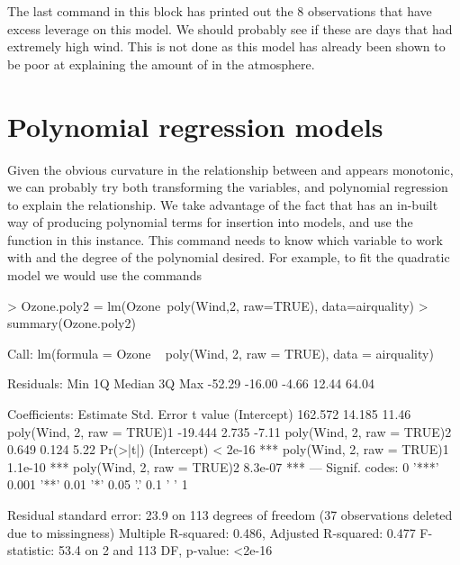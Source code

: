 The last command in this block has printed out the 8 observations that have excess leverage on this model. We should probably see if these are days that had extremely high wind. This is not done as this model has already been shown to be poor at explaining the amount of  in the atmosphere. 
 
 
\section{Polynomial regression models} 
\label{PolyReg} 
 
Given the obvious curvature in the relationship between  and  appears monotonic, we can probably try both transforming the variables, and polynomial regression to explain the relationship. We take advantage of the  
fact that \R{} has an in-built way of producing polynomial terms for insertion into models, and use the  function in this instance. This command needs to know which variable to work with and the degree of the polynomial desired. For example, to fit the quadratic model we would use the commands 

\begin{Schunk}
\begin{Sinput}
> Ozone.poly2 = lm(Ozone~poly(Wind,2, raw=TRUE), data=airquality) 
> summary(Ozone.poly2) 
\end{Sinput}
\begin{Soutput}

Call:
lm(formula = Ozone ~ poly(Wind, 2, raw = TRUE), data = airquality)

Residuals:
   Min     1Q Median     3Q    Max 
-52.29 -16.00  -4.66  12.44  64.04 

Coefficients:
                           Estimate Std. Error t value
(Intercept)                 162.572     14.185   11.46
poly(Wind, 2, raw = TRUE)1  -19.444      2.735   -7.11
poly(Wind, 2, raw = TRUE)2    0.649      0.124    5.22
                           Pr(>|t|)    
(Intercept)                 < 2e-16 ***
poly(Wind, 2, raw = TRUE)1  1.1e-10 ***
poly(Wind, 2, raw = TRUE)2  8.3e-07 ***
---
Signif. codes:  
0 '***' 0.001 '**' 0.01 '*' 0.05 '.' 0.1 ' ' 1

Residual standard error: 23.9 on 113 degrees of freedom
  (37 observations deleted due to missingness)
Multiple R-squared:  0.486,	Adjusted R-squared:  0.477 
F-statistic: 53.4 on 2 and 113 DF,  p-value: <2e-16
\end{Soutput}
\end{Schunk}

